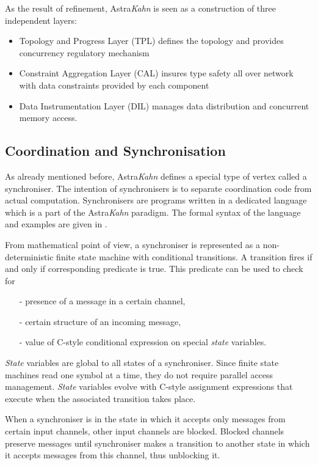 \documentclass{article}
\begin{document}
As the result of refinement, Astra\emph{Kahn} is seen as a construction of three independent layers:
\begin{itemize}
\item Topology and Progress Layer (TPL) defines the topology and provides concurrency regulatory mechanism
\item Constraint Aggregation Layer (CAL) insures type safety all over network with data constraints provided by each component
\item Data Instrumentation Layer (DIL) manages data distribution and concurrent memory access.
\end{itemize}

\subsection{Coordination and Synchronisation}
As already mentioned before, Astra\emph{Kahn} defines a special type of vertex called a synchroniser. The intention of synchronisers is to separate coordination code from actual computation. Synchronisers are programs written in a dedicated language which is a part of the Astra\emph{Kahn} paradigm. The formal syntax of the language and examples are given in \cite{astrakahn}.

From mathematical point of view, a synchroniser is represented as a non-deterministic finite state machine with conditional transitions. A transition fires if and only if corresponding predicate is true. This predicate can be used to check for
\begin{itemize}
\item[-] presence of a message in a certain channel,
\item[-] certain structure of an incoming message,
\item[-] value of C-style conditional expression on special \emph{state} variables.
\end{itemize}
\emph{State} variables are global to all states of a synchroniser. Since finite state machines read one symbol at a time, they do not require parallel access management. \emph{State} variables evolve with C-style assignment expressions that execute when the associated transition takes place.

When a synchroniser is in the state in which it accepts only messages from certain input channels, other input channels are blocked. Blocked channels preserve messages until synchroniser makes a transition to another state in which it accepts messages from this channel, thus unblocking it.
\end{document}
